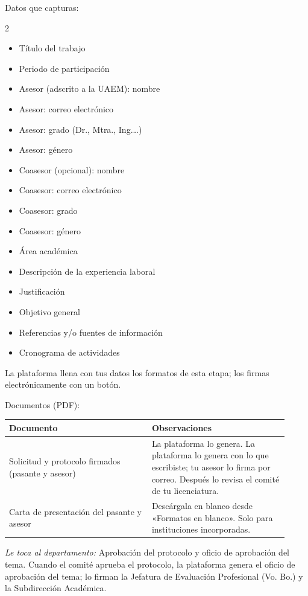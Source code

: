 Datos que capturas:
\begin{multicols}{2}\small
\begin{itemize}
  \item Título del trabajo
  \item Periodo de participación
  \item Asesor (adscrito a la UAEM): nombre
  \item Asesor: correo electrónico
  \item Asesor: grado (Dr., Mtra., Ing.…)
  \item Asesor: género
  \item Coasesor (opcional): nombre
  \item Coasesor: correo electrónico
  \item Coasesor: grado
  \item Coasesor: género
  \item Área académica
  \item Descripción de la experiencia laboral
  \item Justificación
  \item Objetivo general
  \item Referencias y/o fuentes de información
  \item Cronograma de actividades
\end{itemize}
\end{multicols}

La plataforma llena con tus datos los formatos de esta etapa; los firmas electrónicamente con un botón.

Documentos (PDF):
{\small\begin{longtable}{>{\raggedright\arraybackslash}p{0.47\linewidth}>{\raggedright\arraybackslash}p{0.45\linewidth}}
\toprule
\textbf{Documento} & \textbf{Observaciones}\\
\midrule
\endhead
Solicitud y protocolo firmados (pasante y asesor) & La plataforma lo genera. La plataforma lo genera con lo que escribiste; tu asesor lo firma por correo. Después lo revisa el comité de tu licenciatura.\\
Carta de presentación del pasante y asesor & Descárgala en blanco desde «Formatos en blanco». Solo para instituciones incorporadas.\\
\bottomrule
\end{longtable}}

\emph{Le toca al departamento:} Aprobación del protocolo y oficio de aprobación del tema. Cuando el comité aprueba el protocolo, la plataforma genera el oficio de aprobación del tema; lo firman la Jefatura de Evaluación Profesional (Vo. Bo.) y la Subdirección Académica.

